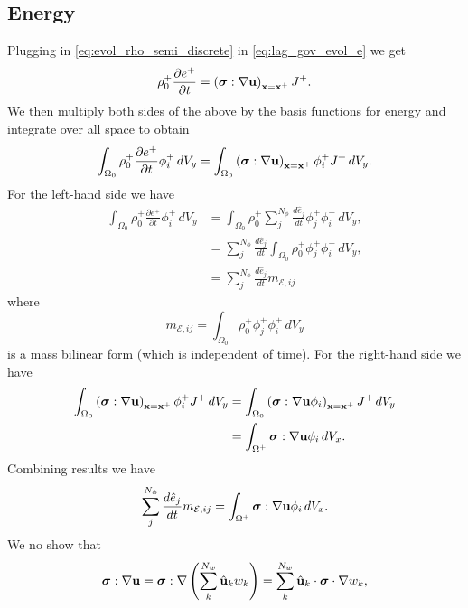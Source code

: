 \documentclass[11pt]{report}
\begin{document}
\subsection{Energy}
Plugging in \cref{eq:evol_rho_semi_discrete} in \cref{eq:lag_gov_evol_e} we get
\begin{equation*}
    \rho^+_0 \frac{\partial e^+}{\partial t} = \left ( \bm \sigma : \nabla \mathbf{u} \right )_{\mathbf{x} = \mathbf{x}^+} J^+.
\end{equation*}
We then multiply both sides of the above by the basis functions for energy and integrate over all space to obtain
\begin{equation*}
    \int_{\Omega_0} \rho^+_0 \frac{\partial e^+}{\partial t} \phi_i^+ \, dV_y = \int_{\Omega_0} \left ( \bm \sigma : \nabla \mathbf{u} \right )_{\mathbf{x} = \mathbf{x}^+} \phi_i^+ J^+ \, dV_y.
\end{equation*}
For the left-hand side we have
\begin{align*}
    \int_{\Omega_0} \rho^+_0 \frac{\partial e^+}{\partial t} \phi_i^+ \, dV_y &= \int_{\Omega_0} \rho^+_0 \sum_j^{N_\phi} \frac{d \hat{e}_j}{dt} \phi_j^+ \phi_i^+ \, dV_y , \nonumber \\
    &= \sum_j^{N_\phi} \frac{d \hat{e}_j}{dt} \int_{\Omega_0} \rho^+_0 \phi_j^+ \phi_i^+ \, dV_y , \nonumber \\
    &= \sum_j^{N_\phi} \frac{d \hat{e}_j}{dt} m_{\mathcal{E},ij}
\end{align*}
where
\begin{equation}
    m_{\mathcal{E},ij} = \int_{\Omega_0} \rho^+_0 \phi_j^+ \phi_i^+ \, dV_y
\end{equation}
is a mass bilinear form (which is independent of time). For the right-hand side we have
\begin{align*}
    \int_{\Omega_0} \left ( \bm \sigma : \nabla \mathbf{u} \right )_{\mathbf{x} = \mathbf{x}^+} \phi_i^+ J^+ \, dV_y &= \int_{\Omega_0} \left ( \bm \sigma : \nabla \mathbf{u} \phi_i \right )_{\mathbf{x} = \mathbf{x}^+} J^+ \, dV_y \nonumber \\
    &= \int_{\Omega^+} \bm \sigma : \nabla \mathbf{u} \phi_i \, dV_x. 
\end{align*}
Combining results we have
\begin{equation*}
    \sum_j^{N_\phi} \frac{d \hat{e}_j}{dt} m_{\mathcal{E},ij} = \int_{\Omega^+} \bm \sigma : \nabla \mathbf{u} \phi_i \, dV_x.
\end{equation*}
We no show that
\begin{equation*}
    \bm \sigma : \nabla \mathbf{u} = \bm \sigma : \nabla \left ( \sum_k^{N_w} \hat{\mathbf{u}}_k w_k \right ) = \sum_k^{N_w} \hat{\mathbf{u}}_k \cdot \bm \sigma \cdot \nabla w_k,
\end{equation*}
\end{document}
